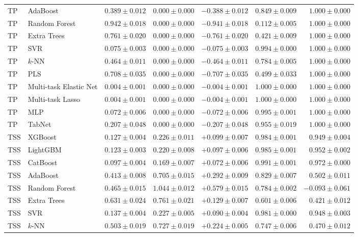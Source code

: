 \begin{longtable}{lp{3.1cm}rrrrr}
TP & AdaBoost & $0.389\pm0.012$ & $0.000\pm0.000$ & $-0.388\pm0.012$ & $0.849\pm0.009$ & $1.000\pm0.000$ \\
TP & Random Forest & $0.942\pm0.018$ & $0.000\pm0.000$ & $-0.941\pm0.018$ & $0.112\pm0.005$ & $1.000\pm0.000$ \\
TP & Extra Trees & $0.761\pm0.020$ & $0.000\pm0.000$ & $-0.761\pm0.020$ & $0.421\pm0.009$ & $1.000\pm0.000$ \\
TP & SVR & $0.075\pm0.003$ & $0.000\pm0.000$ & $-0.075\pm0.003$ & $0.994\pm0.000$ & $1.000\pm0.000$ \\
TP & $k$-NN & $0.464\pm0.011$ & $0.000\pm0.000$ & $-0.464\pm0.011$ & $0.784\pm0.005$ & $1.000\pm0.000$ \\
TP & PLS & $0.708\pm0.035$ & $0.000\pm0.000$ & $-0.707\pm0.035$ & $0.499\pm0.033$ & $1.000\pm0.000$ \\
TP & Multi-task Elastic Net & $0.004\pm0.001$ & $0.000\pm0.000$ & $-0.004\pm0.001$ & $1.000\pm0.000$ & $1.000\pm0.000$ \\
TP & Multi-task Lasso & $0.004\pm0.001$ & $0.000\pm0.000$ & $-0.004\pm0.001$ & $1.000\pm0.000$ & $1.000\pm0.000$ \\
TP & MLP & $0.072\pm0.006$ & $0.000\pm0.000$ & $-0.072\pm0.006$ & $0.995\pm0.001$ & $1.000\pm0.000$ \\
TP & TabNet & $0.207\pm0.048$ & $0.000\pm0.000$ & $-0.207\pm0.048$ & $0.955\pm0.019$ & $1.000\pm0.000$ \\
TSS & XGBoost & $0.127\pm0.004$ & $0.226\pm0.011$ & $+0.099\pm0.007$ & $0.984\pm0.001$ & $0.949\pm0.004$ \\
TSS & LightGBM & $0.123\pm0.003$ & $0.220\pm0.008$ & $+0.097\pm0.006$ & $0.985\pm0.001$ & $0.952\pm0.002$ \\
TSS & CatBoost & $0.097\pm0.004$ & $0.169\pm0.007$ & $+0.072\pm0.006$ & $0.991\pm0.001$ & $0.972\pm0.000$ \\
TSS & AdaBoost & $0.413\pm0.008$ & $0.705\pm0.015$ & $+0.292\pm0.009$ & $0.829\pm0.007$ & $0.502\pm0.011$ \\
TSS & Random Forest & $0.465\pm0.015$ & $1.044\pm0.012$ & $+0.579\pm0.015$ & $0.784\pm0.002$ & $-0.093\pm0.061$ \\
TSS & Extra Trees & $0.631\pm0.024$ & $0.761\pm0.021$ & $+0.129\pm0.007$ & $0.601\pm0.006$ & $0.421\pm0.012$ \\
TSS & SVR & $0.137\pm0.004$ & $0.227\pm0.005$ & $+0.090\pm0.004$ & $0.981\pm0.000$ & $0.948\pm0.003$ \\
TSS & $k$-NN & $0.503\pm0.019$ & $0.727\pm0.019$ & $+0.224\pm0.005$ & $0.747\pm0.006$ & $0.470\pm0.012$ \\

\end{longtable}
